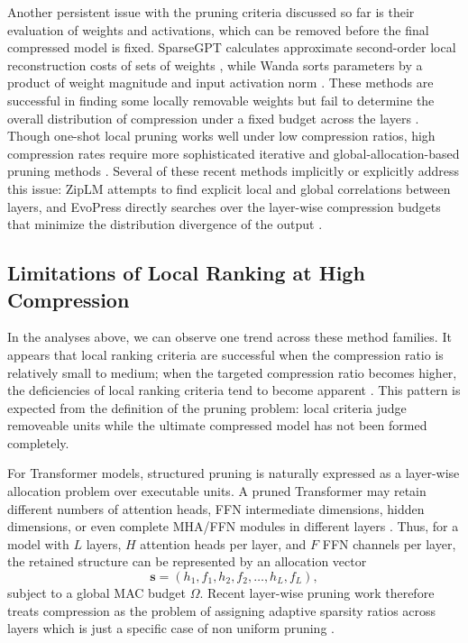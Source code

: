 Another persistent issue with the pruning criteria discussed so far is their evaluation of weights and activations, which can be removed before the final compressed model is fixed. SparseGPT calculates approximate second-order local reconstruction costs of sets of weights \cite{frantar2023sparsegpt}, while Wanda sorts parameters by a product of weight magnitude and input activation norm \cite{sun2023simple}. These methods are successful in finding some locally removable weights but fail to determine the overall distribution of compression under a fixed budget across the layers \cite{hoefler2021sparsity,cheng2024pruningsurvey}. Though one-shot local pruning works well under low compression ratios, high compression rates require more sophisticated iterative and global-allocation-based pruning methods \cite{janusz2025oneshot}. Several of these recent methods implicitly or explicitly address this issue: ZipLM attempts to find explicit local and global correlations between layers, and EvoPress directly searches over the layer-wise compression budgets that minimize the distribution divergence of the output \cite{kurtic2023ziplm,evopress2024}.

\subsection{Limitations of Local Ranking at High Compression}
\label{subsec:inadequacy}

In the analyses above, we can observe one trend across these method families. It appears that local ranking criteria are successful when the compression ratio is relatively small to medium; when the targeted compression ratio becomes higher, the deficiencies of local ranking criteria tend to become apparent \cite{hoefler2021sparsity,sanh2020movement,bai2024sparsellm,janusz2025oneshot}. This pattern is expected from the definition of the pruning problem: local criteria judge removeable units while the ultimate compressed model has not been formed completely.

For Transformer models, structured pruning is naturally expressed as a layer-wise allocation problem over executable units. A pruned Transformer may retain different numbers of attention heads, FFN intermediate dimensions, hidden dimensions, or even complete MHA/FFN modules in different layers \cite{xia2022structured,kurtic2023ziplm,cheng2024pruningsurvey}. Thus, for a model with $L$ layers, $H$ attention heads per layer, and $F$ FFN channels per layer, the retained structure can be represented by an allocation vector
\[
  \mathbf{s} = (h_1, f_1, h_2, f_2, \ldots, h_L, f_L),
\]
subject to a global MAC budget $\Omega$. Recent layer-wise pruning work therefore treats compression as the problem of assigning adaptive sparsity ratios across layers which is just a specific case of non uniform pruning \cite{li2024dsa}.


